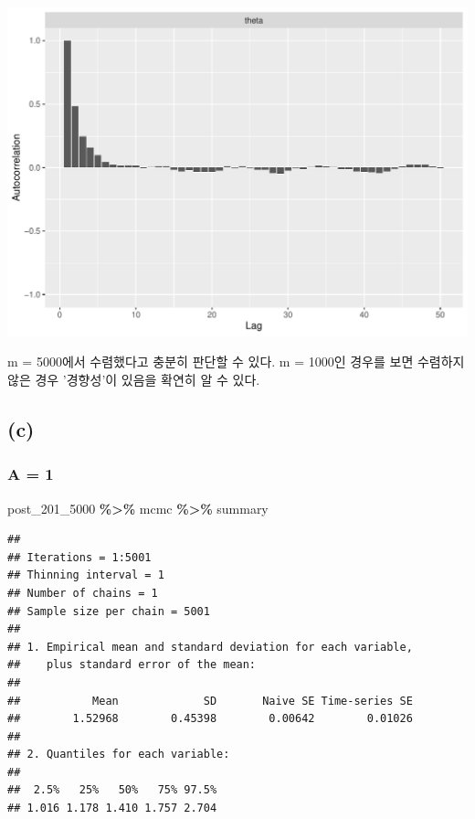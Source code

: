 \documentclass[
]{article}
\newenvironment{Shaded}{\begin{snugshade}}{\end{snugshade}}
\newcommand{\NormalTok}[1]{#1}
\newcommand{\SpecialCharTok}[1]{\textcolor[rgb]{0.81,0.36,0.00}{\textbf{#1}}}
\begin{document}
\begin{center}\includegraphics[width=0.8\linewidth]{Bayes_stat_hw3_files/figure-latex/unnamed-chunk-39-3} \end{center}

m = 5000에서 수렴했다고 충분히 판단할 수 있다. m = 1000인 경우를 보면
수렴하지 않은 경우 '경향성'이 있음을 확연히 알 수 있다.

\subsection{(c)}\label{c-2}

\subsubsection{A = 1}\label{a-1-2}

\begin{Shaded}
\begin{Highlighting}[]
\NormalTok{post\_201\_5000 }\SpecialCharTok{\%\textgreater{}\%}\NormalTok{ mcmc }\SpecialCharTok{\%\textgreater{}\%}\NormalTok{ summary}
\end{Highlighting}
\end{Shaded}

\begin{verbatim}
## 
## Iterations = 1:5001
## Thinning interval = 1 
## Number of chains = 1 
## Sample size per chain = 5001 
## 
## 1. Empirical mean and standard deviation for each variable,
##    plus standard error of the mean:
## 
##           Mean             SD       Naive SE Time-series SE 
##        1.52968        0.45398        0.00642        0.01026 
## 
## 2. Quantiles for each variable:
## 
##  2.5%   25%   50%   75% 97.5% 
## 1.016 1.178 1.410 1.757 2.704
\end{verbatim}
\end{document}
